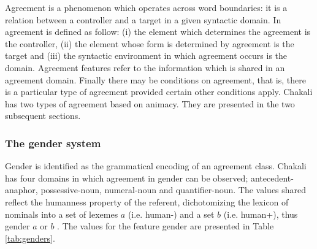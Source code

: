 \begin{exe}
\begin{exe}
\begin{exe}
{\begin{exe}
\begin{exe}
\begin{exe}
\begin{exe}
\begin{exe}
\begin{exe}
\begin{exe}
\begin{exe}
\begin{exe}
\begin{exe}
\begin{exe}
\begin{exe}
\begin{exe}
\begin{exe}
\begin{exe}
\begin{exe}
\begin{exe}
\begin{exe}
Agreement is a phenomenon which operates
across word boundaries: it is a relation between a controller and a
target in a given syntactic domain. In \citet{Corb04, Corb06} 
  agreement is defined as follow: (i) the element which determines the
  agreement is the controller, (ii) the element whose form is determined by
  agreement is the target and (iii) the syntactic environment in which
  agreement occurs is the domain. Agreement features refer to the information
which is shared in an agreement domain. Finally there may be conditions on
  agreement, that  is, there is a particular type of agreement provided certain
  other conditions apply. Chakali has two types of agreement based on animacy.
They are presented in the two subsequent sections. 

\subsubsection{The gender system}
\label{sec:GRM-gender}


Gender is identified as the grammatical encoding of an agreement class.  
Chakali has four domains
in which agreement in gender can be observed; antecedent-anaphor,
possessive-noun, numeral-noun and  quantifier-noun.
The values shared reflect the humanness property of the referent,
dichotomizing the lexicon of nominals into a set of lexemes $a$ (i.e.
human-) and a set $b$ (i.e.  human+), thus {\sc gender} $a$ or
$b$   \citep{brin08c, brin08}.  The values for the feature {\sc gender} are presented in
Table \ref{tab:genders}. 


\begin{table}[htb!]
  \centering
  \caption{Gender in Chakali}
\label{tab:genders}



\end{table}
\end{exe}
\end{exe}
\end{exe}
\end{exe}
\end{exe}
\end{exe}
\end{exe}
\end{exe}
\end{exe}
\end{exe}
\end{exe}
\end{exe}
\end{exe}
\end{exe}
\end{exe}
\end{exe}
\end{exe}
\end{exe}}
\end{exe}
\end{exe}
\end{exe}
